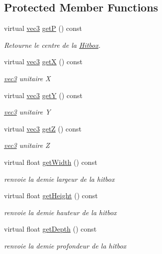 \subsection*{Protected Member Functions}
\begin{DoxyCompactItemize}
\item 
virtual \hyperlink{structvec3}{vec3} \hyperlink{class_camera_a78bcbeed337fb2ee25f1077d11eb8a33}{get\+P} () const 
\begin{DoxyCompactList}\small\item\em Retourne le centre de la \hyperlink{class_hitbox}{Hitbox}. \end{DoxyCompactList}\item 
virtual \hyperlink{structvec3}{vec3} \hyperlink{class_camera_a190a745972d0b797ebb19a2aecd5fbe2}{get\+X} () const 
\begin{DoxyCompactList}\small\item\em \hyperlink{structvec3}{vec3} unitaire X \end{DoxyCompactList}\item 
virtual \hyperlink{structvec3}{vec3} \hyperlink{class_camera_a23b4f98ea112c9c435f9ee8df7cdfc45}{get\+Y} () const 
\begin{DoxyCompactList}\small\item\em \hyperlink{structvec3}{vec3} unitaire Y \end{DoxyCompactList}\item 
virtual \hyperlink{structvec3}{vec3} \hyperlink{class_camera_a5132a2f324c60f0f94d8adb66644e5a3}{get\+Z} () const 
\begin{DoxyCompactList}\small\item\em \hyperlink{structvec3}{vec3} unitaire Z \end{DoxyCompactList}\item 
virtual float \hyperlink{class_camera_a1b29933f81edb6cac6815a139442e6c5}{get\+Width} () const 
\begin{DoxyCompactList}\small\item\em renvoie la demie largeur de la hitbox \end{DoxyCompactList}\item 
virtual float \hyperlink{class_camera_af34538e81e41b215ffcae141b238a84d}{get\+Height} () const 
\begin{DoxyCompactList}\small\item\em renvoie la demie hauteur de la hitbox \end{DoxyCompactList}\item 
virtual float \hyperlink{class_camera_ae8be0ecf4c8611d787f4234832ee8419}{get\+Depth} () const 
\begin{DoxyCompactList}\small\item\em renvoie la demie profondeur de la hitbox \end{DoxyCompactList}\end{DoxyCompactItemize}
